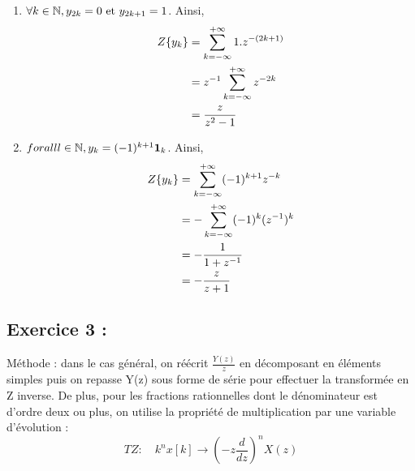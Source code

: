 \documentclass[../main.tex]{subfiles}
\begin{document}
\begin{enumerate}
\item $\forall k \in \mathbb{N}, y_{2k} = 0 \text{ et } y_{2k+1} = 1$. Ainsi,
\begin{align*}
Z\{y_k\} & = \sum_{k=-\infty}^{+\infty} 1.z^{-(2k+1)} \\
& = z^{-1} \sum_{k=-\infty}^{+\infty} z^{-2k} \\
& = \frac{z}{z^2-1}
\end{align*}

\item $forall l \in \mathbb{N}, y_k = (-1)^{k+1} \mathbf{1}_k$. Ainsi,
\begin{align*}
Z\{y_k\} & = \sum_{k=-\infty}^{+\infty} (-1)^{k+1}z^{-k} \\
& = - \sum_{k=-\infty}^{+\infty} (-1)^k(z^{-1})^k \\
& = - \frac{1}{1+z^{-1}} \\
& = - \frac{z}{z+1}
\end{align*}
\end{enumerate}

\subsection*{Exercice 3 :}
\noindent Méthode : dans le cas général, on réécrit $\frac{Y(z)}{z}$ en décomposant en éléments simples puis on repasse Y(z) sous forme de série pour effectuer la transformée en Z inverse. De plus, pour les fractions rationnelles dont le dénominateur est d'ordre deux ou plus, on utilise la propriété de multiplication par une variable d'évolution :
\[TZ : \quad k^n x[k] \rightarrow (-z \frac{d}{dz})^n X(z) \] \\
\end{document}
